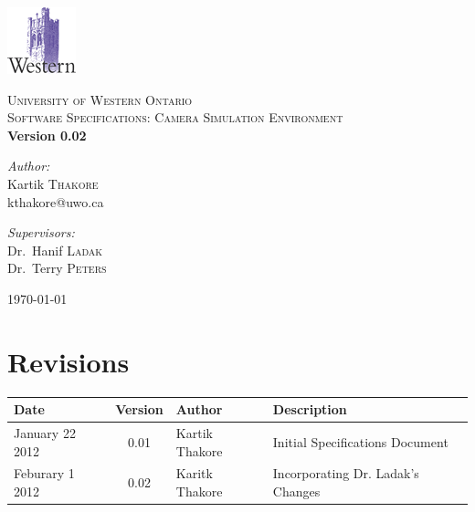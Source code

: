 \documentclass[11pt]{report}
\begin{document}
\begin{titlepage}

\begin{center}


\includegraphics[scale=1.0]{images/logo.png}

\textsc{\LARGE University of Western Ontario}\\[1.5cm]

\textsc{\Large Software Specifications: Camera Simulation Environment}\\[0.5cm]


{ \huge \bfseries Version 0.02}\\[0.4cm]

\begin{minipage}{0.4\textwidth}
\begin{flushleft} \large
\emph{Author:}\\
Kartik \textsc{Thakore} \\
kthakore@uwo.ca 
\end{flushleft}
\end{minipage}
\begin{minipage}{0.4\textwidth}
\begin{flushright} \large
\emph{Supervisors:} \\
Dr.~Hanif \textsc{Ladak}\\
Dr.~Terry \textsc{Peters} 
\end{flushright}
\end{minipage}

\vfill

{\large \today}

\end{center}

\end{titlepage}

\nocite{*}

\tableofcontents

\listoffigures 

\printglossaries

\newpage 

\chapter{Revisions}
\begin{center}
\begin{tabular}{| l | c | l | p{9cm} |}
\hline
Date & Version & Author & Description \\ 
\hline
January 22 2012 & 0.01 & Kartik Thakore & Initial Specifications Document \\
\hline
Feburary 1 2012 & 0.02 & Karitk Thakore & Incorporating Dr. Ladak's Changes \\
\hline
\end{tabular}
\end{center}
\end{document}
